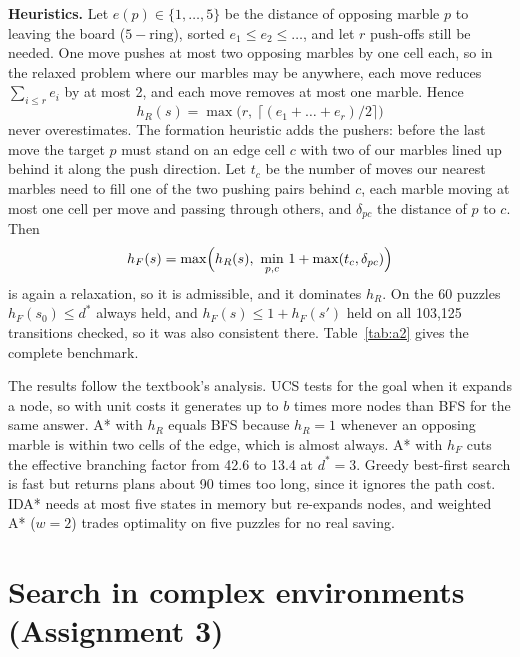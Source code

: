 \documentclass[a4paper,10pt]{article}
\begin{document}
\textbf{Heuristics.} Let $e(p)\in\{1,\dots,5\}$ be the distance of opposing marble $p$ to leaving the board
($5-\text{ring}$), sorted $e_1\le e_2\le\dots$, and let $r$ push-offs still be needed. One move pushes at most two
opposing marbles by one cell each, so in the relaxed problem where our marbles may be anywhere, each move reduces
$\sum_{i\le r} e_i$ by at most 2, and each move removes at most one marble. Hence
\begin{equation}
h_R(s) = \max\bigl(r,\ \lceil (e_1+\dots+e_r)/2\rceil\bigr)
\end{equation}
never overestimates. The formation heuristic adds the pushers: before the last move the target $p$ must stand on an
edge cell $c$ with two of our marbles lined up behind it along the push direction. Let $t_c$ be the number of moves
our nearest marbles need to fill one of the two pushing pairs behind $c$, each marble moving at most one cell per
move and passing through others, and $\delta_{pc}$ the distance of $p$ to $c$. Then
\begin{equation}
h_F(s) = \max\Bigl(h_R(s),\ \min_{p,c}\, 1 + \max(t_c,\delta_{pc})\Bigr)
\end{equation}
is again a relaxation, so it is admissible, and it dominates $h_R$. On the 60 puzzles $h_F(s_0)\le d^*$ always held,
and $h_F(s)\le 1+h_F(s')$ held on all 103,125 transitions checked, so it was also consistent there.
Table~\ref{tab:a2} gives the complete benchmark.



The results follow the textbook's analysis. UCS tests for the goal when it expands a node, so with unit costs it
generates up to $b$ times more nodes than BFS for the same answer. A* with $h_R$ equals BFS because $h_R=1$ whenever
an opposing marble is within two cells of the edge, which is almost always. A* with $h_F$ cuts the effective
branching factor from 42.6 to 13.4 at $d^*=3$. Greedy best-first search is fast but returns plans about 90 times
too long, since it ignores the path cost. IDA* needs at most five states in memory but re-expands nodes, and
weighted A* ($w=2$) trades optimality on five puzzles for no real saving.

\section{Search in complex environments (Assignment 3)}


\end{document}
